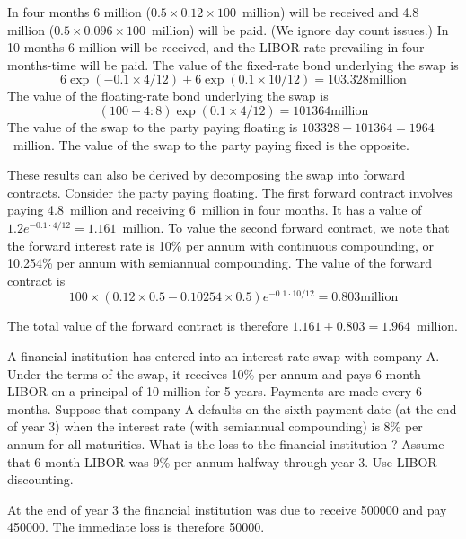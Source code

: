 \documentclass[12pt,a4paper]{exam}
\begin{document}
\begin{questions}
\begin{solution}
In four months 6 million ($0.5\times 0.12\times 100$~million) will be received and 4.8 million ($0.5\times 0.096\times 100$~million) will be paid. (We ignore day count issues.) In 10 months 6 million will be received, and the LIBOR rate prevailing in four months-time will be paid. The value of the fixed-rate bond underlying the swap is
\begin{equation*}
6 \exp(-0.1 \times 4/12) + 6 \exp(0.1\times  10/12) = 103.328 \text{million}
\end{equation*}
The value of the floating-rate bond underlying the swap is 
\begin{equation*}
(100 + 4:8) \exp(0.1\times  4/12) = 101364 \text{million}
\end{equation*}
The value of the swap to the party paying floating is $103328-  101364 = 1964$~million. 
The value of the swap to the party paying fixed is the opposite. 

These results can also be derived by decomposing the swap into forward contracts. Consider the party paying floating. The first forward contract involves paying 4.8~million and receiving 6~million in four months. It has a value of $1.2e^{-0.1\cdot 4/12} = 1.161$~million.
To value the second forward contract, we note that the forward interest rate is 10\% per annum with continuous compounding, or 10.254\% per annum with semiannual compounding. The value of the forward contract is
\begin{equation*}
100\times  (0.12\times 0.5-0.10254\times 0.5)e^{-0.1\cdot 10/12} = 0.803 \text{million}
\end{equation*}

The total value of the forward contract is therefore $1.161 + 0.803 = 1.964$~million.
\end{solution}

\question  A financial institution has entered into an interest rate swap with company A. Under the terms of the swap, it receives 10\% per annum and pays 6-month LIBOR on a principal of 10 million for 5 years. Payments are made every 6 months. 
Suppose that company A defaults on the sixth payment date (at the end of year 3) when the interest rate (with semiannual compounding) is 8\% per annum for all maturities. 
What is the loss to the financial institution ? Assume that 6-month LIBOR was 9\% per annum halfway through year 3. 
Use LIBOR discounting.

\begin{solution}
At the end of year 3 the financial institution was due to receive 500000 and pay 450000. The immediate loss is therefore 50000.


\end{solution}
\end{questions}
\end{document}
